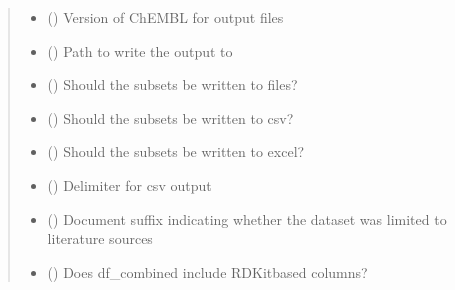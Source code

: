 \documentclass[letterpaper,10pt,english]{sphinxmanual}
\begin{document}
\begin{fulllineitems}
\begin{quote}
\begin{description}
\begin{itemize}
\item {} 
\sphinxAtStartPar
{} () \textendash{} Version of ChEMBL for output files

\item {} 
\sphinxAtStartPar
{} () \textendash{} Path to write the output to

\item {} 
\sphinxAtStartPar
{} () \textendash{} Should the subsets be written to files?

\item {} 
\sphinxAtStartPar
{} () \textendash{} Should the subsets be written to csv?

\item {} 
\sphinxAtStartPar
{} () \textendash{} Should the subsets be written to excel?

\item {} 
\sphinxAtStartPar
{} () \textendash{} Delimiter for csv output

\item {} 
\sphinxAtStartPar
{} () \textendash{} Document suffix indicating
whether the dataset was limited to literature sources

\item {} 
\sphinxAtStartPar
{} () \textendash{} Does df\_combined include RDKit\sphinxhyphen{}based columns?

\end{itemize}

\end{description}\end{quote}

\end{fulllineitems}

\end{document}
